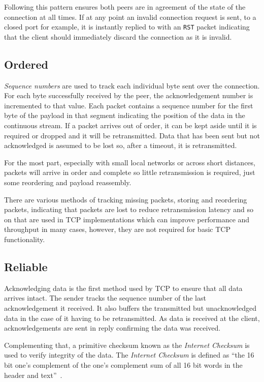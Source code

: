         Following this pattern ensures both peers are in agreement of the state of the connection at all times. If at any point an invalid connection request is sent, to a closed port for example, it is instantly replied to with an \texttt{RST} packet indicating that the client should immediately discard the connection as it is invalid.

    \subsection{Ordered}
        \textit{Sequence numbers} are used to track each individual byte sent over the connection. For each byte successfully received by the peer, the acknowledgement number is incremented to that value. Each packet contains a sequence number for the first byte of the payload in that segment indicating the position of the data in the continuous stream. If a packet arrives out of order, it can be kept aside until it is required or dropped and it will be retransmitted. Data that has been sent but not acknowledged is assumed to be lost so, after a timeout, it is retransmitted.

        For the most part, especially with small local networks or across short distances, packets will arrive in order and complete so little retransmission is required, just some reordering and payload reassembly.

        There are various methods of tracking missing packets, storing and reordering packets, indicating that packets are lost to reduce retransmission latency and so on that are used in \gls{TCP} implementations which can improve performance and throughput in many cases, however, they are not required for basic \gls{TCP} functionality.

    \subsection{Reliable}\label{sec:reliable}
        Acknowledging data is the first method used by \gls{TCP} to ensure that all data arrives intact. The sender tracks the sequence number of the last acknowledgement it received. It also buffers the transmitted but unacknowledged data in the case of it having to be retransmitted. As data is received at the client, acknowledgements are sent in reply confirming the data was received.

        Complementing that, a primitive checksum known as the \textit{Internet Checksum} is used to verify integrity of the data. The \textit{Internet Checksum} is defined as ``the 16 bit one's complement of the one's complement sum of all 16 bit words in the header and text''~\cite[3.1]{rfc793}.

